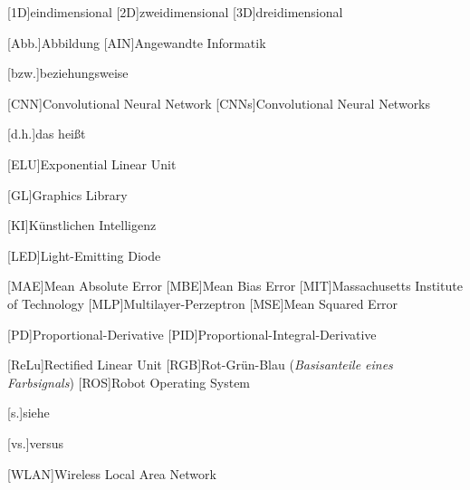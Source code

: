 
\begin{acronym}[ROS]
	[1D]{eindimensional}
	[2D]{zweidimensional}
	[3D]{dreidimensional}
	
	[Abb.]{Abbildung}
	[AIN]{Angewandte Informatik}
	
	[bzw.]{beziehungsweise}
	
	[CNN]{Convolutional Neural Network}
	[CNNs]{Convolutional Neural Networks}
	
	[d.h.]{das heißt}
	
	[ELU]{Exponential Linear Unit}
	
	[GL]{Graphics Library}
	
	[KI]{Künstlichen Intelligenz}
	
	[LED]{Light-Emitting Diode}
	
	[MAE]{Mean Absolute Error}
	[MBE]{Mean Bias Error}
	[MIT]{Massachusetts Institute of Technology}
	[MLP]{Multilayer-Perzeptron}
	[MSE]{Mean Squared Error}
	
	[PD]{Proportional-Derivative}
	[PID]{Proportional-Integral-Derivative}
	
	[ReLu]{Rectified Linear Unit}
	[RGB]{Rot-Grün-Blau (\textit{Basisanteile eines Farbsignals})}
	[ROS]{Robot Operating System}
	
	[s.]{siehe}
	
	[vs.]{versus}
	
	[WLAN]{Wireless Local Area Network}
\end{acronym}
